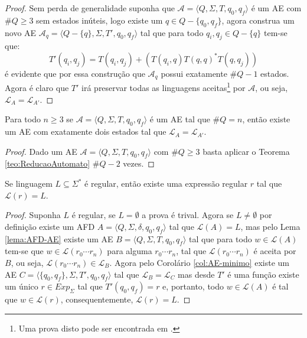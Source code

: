 \begin{proof}
	Sem perda de generalidade suponha que $\mathcal{A} = \langle Q, \Sigma, T, q_0, q_f \rangle$ é um AE com $\#Q \geq 3$ sem estados inúteis, logo existe um $q \in Q - \{q_0, q_f\}$, agora construa um novo AE $\mathcal{A}_q = \langle Q - \{q\}, \Sigma, T', q_0, q_f \rangle$ tal que para todo $q_i, q_j \in Q - \{q\}$ tem-se que:
	$$T'(q_i, q_j) = T(q_i, q_j) + (T(q_i, q)T(q,q)^*T(q, q_j))$$
	é evidente que por essa construção que $\mathcal{A}_q$ possui exatamente $\#Q - 1$ estados. Agora é claro que $T'$ irá preservar todas as linguagens aceitas\footnote{Uma prova disto pode ser encontrada em \cite{erickson2014,han2005}.} por $\mathcal{A}$, ou seja, $\mathcal{L}_A = \mathcal{L}_{A'}$.
\end{proof}

\begin{corolario}\label{col:AE-minimo}
	Para todo  $n \geq 3$ se $\mathcal{A} = \langle Q, \Sigma, T, q_0, q_f \rangle$ é um AE tal que $\#Q = n$, então existe um AE com exatamente dois estados tal que $\mathcal{L}_A = \mathcal{L}_{A'}$.
\end{corolario}

\begin{proof}
	Dado um AE $\mathcal{A} = \langle Q, \Sigma, T, q_0, q_f \rangle$  com $\#Q \geq 3$ basta aplicar o Teorema \ref{teo:ReducaoAutomato} $\#Q - 2$ vezes.
\end{proof}

\begin{teorema}\label{teo:AFD-Regex}
	Se linguagem $L \subseteq \Sigma^*$ é regular, então existe uma expressão regular $r$ tal que $\mathcal{L}(r) = L$.
\end{teorema}

\begin{proof}
	Suponha $L$ é regular, se $L = \emptyset$ a prova é trival. Agora se $L \neq \emptyset$ por definição existe um AFD $A = \langle Q, \Sigma, \delta, q_0, q_f \rangle$ tal que $\mathcal{L}(A) = L$, mas pelo Lema \ref{lema:AFD-AE} existe um AE $B = \langle Q, \Sigma, T, q_0, q_f \rangle$ tal que para todo $w \in \mathcal{L}(A)$ tem-se que $w \in \mathcal{L}(r_0\cdots r_n)$ para alguma $r_0\cdots r_n$, tal que $\mathcal{L}(r_0\cdots r_n)$ é aceita por $B$, ou seja, $\mathcal{L}(r_0\cdots r_n) \in \mathcal{L}_B$. Agora pelo Corolário \ref{col:AE-minimo} existe um AE $C = \langle \{q_0, q_f\}, \Sigma, T', q_0, q_f \rangle$ tal que $\mathcal{L}_B = \mathcal{L}_C$ mas desde $T'$ é uma função existe um único $r \in Exp_\Sigma$ tal que $T'(q_0, q_f) = r$ e, portanto, todo $w \in \mathcal{L}(A)$ é tal que $w \in \mathcal{L}(r)$, consequentemente, $\mathcal{L}(r) = L$.
\end{proof}

